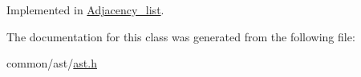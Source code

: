 Implemented in \hyperlink{classAdjacency__list_a129aec8db0fc3b6109de60f765c41ac4}{Adjacency\-\_\-list}.



The documentation for this class was generated from the following file\-:\begin{DoxyCompactItemize}
\item 
common/ast/\hyperlink{ast_8h}{ast.\-h}\end{DoxyCompactItemize}
